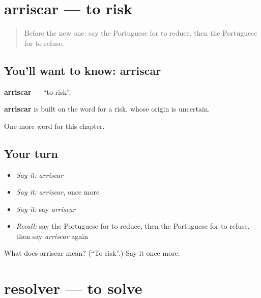 \section[arriscar]{arriscar — to risk}

\label{lesson:PT-C176-arriscar}



\begin{quote}
Before the new one: say the Portuguese for to reduce, then the Portuguese for to refuse.
\end{quote}

\subsection*{You'll want to know: arriscar}
\textbf{arriscar} — \textquotedblleft{}to risk\textquotedblright{}.

\begin{cousinweb}
\textbf{arriscar} is built on the word for a risk, whose origin is uncertain.
\end{cousinweb}

\begin{grammarlens}[title={What you've built}]
One more word for this chapter.
\end{grammarlens}

\subsection*{Your turn}
\begin{itemize}
\raggedright
  \item \emph{Say it:} \emph{arriscar}
  \item \emph{Say it:} \emph{arriscar}, once more
  \item \emph{Say it:} say \emph{arriscar}
  \item \emph{Recall:} say the Portuguese for to reduce, then the Portuguese for to refuse, then say \emph{arriscar} again
\end{itemize}

\begin{tcolorbox}[breakable,colback=teal!4,colframe=teal!35!black,title={Before you move on}]
What does arriscar mean? (\textquotedblleft{}To risk\textquotedblright{}.) Say it once more.
\end{tcolorbox}
\section[resolver]{resolver — to solve}

